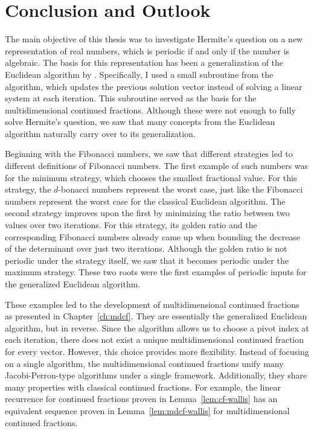 \chapter{Conclusion and Outlook}
\label{ch:conclusion}

The main objective of this thesis
was to investigate Hermite's question
on a new representation of real numbers,
which is periodic if and only if the number is algebraic.
The basis for this representation has been a generalization of the Euclidean
algorithm by \citeauthor{Klein24}.
Specifically, I used a small subroutine from the algorithm,
which updates the previous solution vector instead of solving a linear system
at each iteration.
This subroutine served as the basis for the multidimensional continued fractions.
Although these were not enough to fully solve Hermite's question,
we saw that many concepts from the Euclidean algorithm naturally carry
over to its generalization.

Beginning with the Fibonacci numbers,
we saw that different strategies led to different definitions of Fibonacci numbers.
The first example of such numbers was for the minimum strategy,
which chooses the smallest fractional value.
For this strategy, the $d$-bonacci numbers represent the worst case,
just like the Fibonacci numbers represent the worst case for the classical
Euclidean algorithm.
The second strategy improves upon the first by minimizing the ratio between two values over two iterations.
For this strategy, its golden ratio and the corresponding Fibonacci numbers
already came up when bounding the decrease of the determinant over just two iterations.
Although the golden ratio is not periodic under the strategy itself,
we saw that it becomes periodic under the maximum strategy.
These two roots were the first examples of periodic inputs for the generalized
Euclidean algorithm.

These examples led to the development of multidimensional continued fractions
as presented in Chapter~\ref{ch:mdcf}.
They are essentially the generalized Euclidean algorithm, but in reverse.
Since the algorithm allows us to choose a pivot index at each iteration,
there does not exist a unique multidimensional continued fraction for every vector.
However, this choice provides more flexibility.
Instead of focusing on a single algorithm, the multidimensional continued
fractions unify many Jacobi-Perron-type algorithms under a single framework.
Additionally, they share many properties with classical continued fractions.
For example, the linear recurrence for continued fractions proven in Lemma~\ref{lem:cf-wallis}
has an equivalent sequence proven in Lemma~\ref{lem:mdcf-wallis} for
multidimensional continued fractions.

